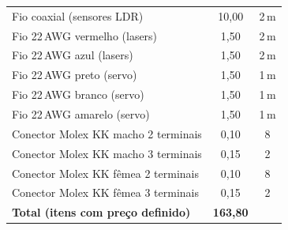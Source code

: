 \begin{table}[H]
\begin{tabular}{lcc}
Fio coaxial (sensores LDR)             & 10,00 & 2\,m \\
Fio 22\,AWG vermelho (lasers)          & 1,50  & 2\,m \\
Fio 22\,AWG azul (lasers)              & 1,50  & 2\,m \\
Fio 22\,AWG preto (servo)              & 1,50  & 1\,m \\
Fio 22\,AWG branco (servo)             & 1,50  & 1\,m \\
Fio 22\,AWG amarelo (servo)            & 1,50  & 1\,m \\
Conector Molex KK macho 2 terminais    & 0,10  & 8  \\
Conector Molex KK macho 3 terminais    & 0,15  & 2  \\
Conector Molex KK fêmea 2 terminais    & 0,10  & 8  \\
Conector Molex KK fêmea 3 terminais    & 0,15  & 2  \\
\hline
\textbf{Total (itens com preço definido)} & \textbf{163,80} & \\
\hline
\end{tabular}
\end{table}
 
